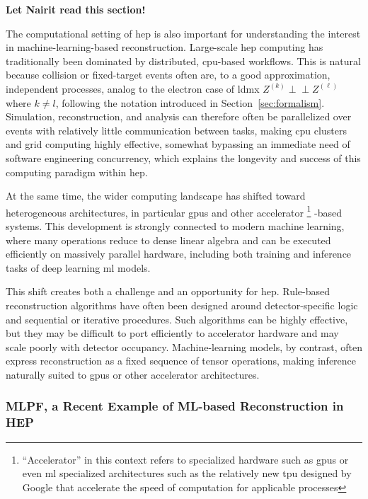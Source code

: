 \textbf{Let Nairit read this section!}

The computational setting of \gls{hep} is also important for understanding the interest in machine-learning-based reconstruction. Large-scale \gls{hep} computing has traditionally been dominated by distributed, \gls{cpu}-based workflows. \cite{sur2026-heterogeneous-computing} This is natural because collision or fixed-target events often are, to a good approximation, independent processes, analog to the electron case of \gls{ldmx} $Z^{(k)} \perp\!\!\!\perp Z^{(\ell)}$ where $k \neq l$, following the notation introduced in Section~\ref{sec:formalism}. Simulation, reconstruction, and analysis can therefore often be parallelized over events with relatively little communication between tasks, making \gls{cpu} clusters and grid computing highly effective, somewhat bypassing an immediate need of software engineering concurrency, which explains the longevity and success of this computing paradigm within \gls{hep}.

At the same time, the wider computing landscape has shifted toward heterogeneous architectures, in particular \glspl{gpu} and other accelerator \footnote{``Accelerator'' in this context refers to specialized hardware such as \glspl{gpu} or even \gls{ml} specialized architectures such as the relatively new \gls{tpu} designed by Google that accelerate the speed of computation for applicable processes\cite{needed}}
-based systems. This development is strongly connected to modern machine learning, where many operations reduce to dense linear algebra and can be executed efficiently on massively parallel hardware, including both training and inference tasks of deep learning \gls{ml} models.

This shift creates both a challenge and an opportunity for \gls{hep}. Rule-based reconstruction algorithms have often been designed around detector-specific logic and sequential or iterative procedures. Such algorithms can be highly effective, but they may be difficult to port efficiently to accelerator hardware and may scale poorly with detector occupancy. Machine-learning models, by contrast, often express reconstruction as a fixed sequence of tensor operations, making inference naturally suited to \glspl{gpu} or other accelerator architectures. 

\subsubsection{MLPF, a Recent Example of ML-based Reconstruction in HEP}

